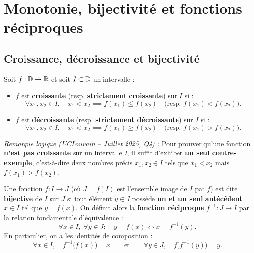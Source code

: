 \section{Monotonie, bijectivité et fonctions réciproques}

\subsection{Croissance, décroissance et bijectivité}

\begin{definition}
Soit $f : \mathbb{D} \to \mathbb{R}$ et soit $I \subset \mathbb{D}$ un intervalle :
\begin{itemize}
    \item $f$ est \textbf{croissante} (resp. \textbf{strictement croissante}) sur $I$ si :
    \[
        \forall x_1, x_2 \in I, \quad x_1 < x_2 \implies f(x_1) \le f(x_2) \quad \bigl(\text{resp. } f(x_1) < f(x_2)\bigr).
    \]
    \item $f$ est \textbf{décroissante} (resp. \textbf{strictement décroissante}) sur $I$ si :
    \[
        \forall x_1, x_2 \in I, \quad x_1 < x_2 \implies f(x_1) \ge f(x_2) \quad \bigl(\text{resp. } f(x_1) > f(x_2)\bigr).
    \]
\end{itemize}
\emph{Remarque logique (UCLouvain -- Juillet 2025, Q4) :} Pour prouver qu'une fonction \textbf{n'est pas croissante} sur un intervalle $I$, il suffit d'exhiber \textbf{un seul contre-exemple}, c'est-à-dire deux nombres précis $x_1, x_2 \in I$ tels que $x_1 < x_2$ mais $f(x_1) > f(x_2)$.
\end{definition}

\begin{definition}
Une fonction $f : I \to J$ (où $J = f(I)$ est l'ensemble image de $I$ par $f$) est dite \textbf{bijective} de $I$ sur $J$ si tout élément $y \in J$ possède \textbf{un et un seul antécédent} $x \in I$ tel que $y = f(x)$.
On définit alors la \textbf{fonction réciproque} $f^{-1} : J \to I$ par la relation fondamentale d'équivalence :
\[
    \boxed{\forall x \in I, \;\forall y \in J : \quad y = f(x) \iff x = f^{-1}(y)}.
\]
En particulier, on a les identités de composition :
\[
    \forall x \in I, \quad f^{-1}\bigl(f(x)\bigr) = x \qquad \text{et} \qquad \forall y \in J, \quad f\bigl(f^{-1}(y)\bigr) = y.
\]
\end{definition}

